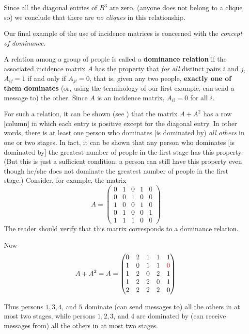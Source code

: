 Since all the diagonal entries of \(B^3\) are zero, (anyone does not belong to a clique so) we conclude that there are \emph{no cliques} in this relationship.

Our final example of the use of incidence matrices is concerned with the \emph{concept of dominance}.

\begin{additional definition} \label{adef 2.9}
A relation among a group of people is called a \textbf{dominance relation} if the associated incidence matrix \(A\) has the property that \emph{for all} distinct pairs \(i\) and \(j\), \(A_{ij} = 1\) if and only if \(A_{ji} = 0\),
that is, given any two people, \textbf{exactly one of them dominates} (or, using the terminology of our first example, can send a message to) the other.
Since \(A\) is an incidence matrix, \(A_{ii} = 0\) for all \(i\).
\end{additional definition}

For such a relation, it can be shown (see ) that the matrix \(A + A^2\) has a row [column] in which each entry is positive except for the diagonal entry.
In other words, there is at least one person who dominates [is dominated by) \emph{all others} in one or two stages.
In fact, it can be shown that any person who dominates [is dominated by] the greatest number of people in the first stage has this property.
(But this is just a sufficient condition;
a person can still have this property even though he/she does not dominate the greatest number of people in the first stage.)
Consider, for example, the matrix
\[
    A = \begin{pmatrix}
        0 & 1 & 0 & 1 & 0 \\
        0 & 0 & 1 & 0 & 0 \\
        1 & 0 & 0 & 1 & 0 \\
        0 & 1 & 0 & 0 & 1 \\
        1 & 1 & 1 & 0 & 0
    \end{pmatrix}
\]
The reader should verify that this matrix corresponds to a dominance relation.

Now
\[
    A + A^2 = A = \begin{pmatrix}
        0 & 2 & 1 & 1 & 1 \\
        1 & 0 & 1 & 1 & \RED{0} \\
        1 & 2 & 0 & 2 & 1 \\
        1 & 2 & 2 & 0 & 1 \\
        2 & 2 & 2 & 2 & 0
    \end{pmatrix}
\]

Thus persons \(1, 3, 4\), and \(5\) dominate (can send messages to) all the others in at most two stages,
while persons \(1, 2, 3\), and \(4\) are dominated by (can
receive messages from) all the others in at most two stages.